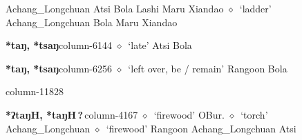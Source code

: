          Achang\_Longchuan 
\hspace{1ex}
         Atsi 
\hspace{1ex}
         Bola 
\hspace{1ex}
         Lashi 
\hspace{1ex}
         Maru 
\hspace{1ex}
         Xiandao 
\hspace{1ex}
         $\diamond$~`ladder'
         Achang\_Longchuan 
\hspace{1ex}
         Bola 
\hspace{1ex}
         Maru 
\hspace{1ex}
         Xiandao 
  \item {\footnotesize \textbf{*taŋ, *tsaŋ}}{\tiny column-6144}
         $\diamond$~`late'
         Atsi 
\hspace{1ex}
         Bola 
  \item {\footnotesize \textbf{*taŋ, *tsaŋ}}{\tiny column-6256}
         $\diamond$~`left over, be / remain'
         Rangoon 
\hspace{1ex}
         Bola 
  \item {\footnotesize \textbf{}}{\tiny column-11828}
  \item {\footnotesize \textbf{*ʔtaŋH, *taŋH\,?\,}}{\tiny column-4167}
         $\diamond$~`firewood'
         OBur. 
\hspace{1ex}
         $\diamond$~`torch'
         Achang\_Longchuan 
\hspace{1ex}
         $\diamond$~`firewood'
         Rangoon 
\hspace{1ex}
         Achang\_Longchuan 
\hspace{1ex}
         Atsi 
\hspace{1ex}
